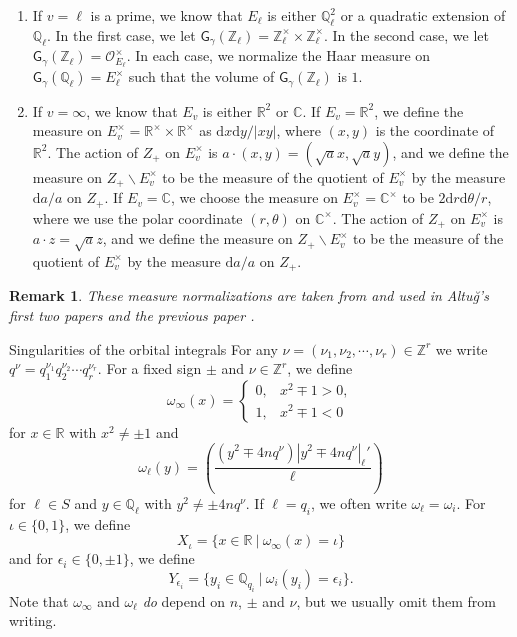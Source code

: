 \documentclass[10pt,oneside,reqno]{amsart}
\makeatletter
\newcommand\rmd{\mathrm{d}}
\newcommand\cO{\mathcal{O}}
\newcommand\CC{\mathbb{C}}
\newcommand\QQ{\mathbb{Q}}
\newcommand\RR{\mathbb{R}}
\newcommand\ZZ{\mathbb{Z}}
\newcommand\G{\mathsf{G}}
\newcommand\bs{\backslash}
\newcommand\legendresymbol[2]{\genfrac{(}{)}{}{}{#1}{#2}}
\def\subsection{\@startsection{subsection}{2}
  \z@{3pt\@plus0pt}{-.5em}%
  {\normalfont\bfseries}}
\theoremstyle{THEOREM}
\theoremstyle{DEFINITION}
\theoremstyle{EXERCISE}
\newtheorem{remark}[theorem]{Remark}
\numberwithin{equation}{section}
\makeatother
\begin{document}
\begin{enumerate}[itemsep=0pt,parsep=0pt,topsep=0pt,leftmargin=0pt,labelsep=3pt,itemindent=9pt,label=\textbullet]
  \item If $v=\ell$ is a prime, we know that $E_\ell$ is either $\QQ_\ell^2$ or a quadratic extension of $\QQ_\ell$. In the first case, we let $\G_\gamma(\ZZ_\ell)=\ZZ_\ell^\times \times \ZZ_\ell^\times$. In the second case, we let $\G_\gamma(\ZZ_\ell)=\cO_{E_\ell}^\times$.
  In each case, we normalize the Haar measure on $\G_\gamma(\QQ_\ell)=E_\ell^\times$ such that the volume of $\G_\gamma(\ZZ_\ell)$ is $1$.
  \item If $v=\infty$, we know that $E_v$ is either $\RR^2$ or $\CC$. If $E_v=\RR^2$, we define the measure on $E_v^\times=\RR^\times \times \RR^\times$ as $\rmd x\rmd y/|xy|$, where $(x,y)$ is the coordinate of $\RR^2$. The action of $Z_+$ on $E_v^\times$ is $a\cdot(x,y)=(\sqrt{a}x,\sqrt{a}y)$, and we define the measure on $Z_+\bs E_v^\times$ to be the measure of the quotient of $E_v^\times$ by the measure $\rmd a/a$ on $Z_+$. If $E_v=\CC$, we choose the  measure on $E_v^\times=\CC^\times$ to be $2\rmd r\rmd \theta/r$, where we use the polar coordinate $(r,\theta)$ on $\CC^\times$. The action of $Z_+$ on $E_v^\times$ is $a\cdot z=\sqrt{a}z$, and we define the measure on $Z_+\bs E_v^\times$ to be the measure of the quotient of $E_v^\times$ by the measure $\rmd a/a$ on $Z_+$.
\end{enumerate} 

\begin{remark}
These measure normalizations are taken from \cite{langlands2004} and used in Altu\u{g}'s first two papers \cite{altug2015,altug2017} and the previous paper \cite{cheng2025}.
\end{remark}

\subsection{Singularities of the orbital integrals}\label{subsec:singularities}
For any $\nu=(\nu_1,\nu_2,\cdots,\nu_r)\in \ZZ^r$ we write $q^\nu=q_1^{\nu_1}q_2^{\nu_2}\cdots q_r^{\nu_r}$.  For a fixed sign $\pm$ and $\nu\in \ZZ^r$, we define
\[
\omega_\infty(x)=\begin{cases}
             0, & x^2\mp 1>0, \\
             1, & x^2\mp 1<0
           \end{cases}
\]
for $x\in \RR$ with $x^2\neq \pm 1$ and
\[
\omega_\ell(y)=\legendresymbol{(y^2\mp 4nq^\nu)|y^2\mp 4nq^\nu|_{\ell}'}{\ell}
\]
for $\ell\in S$ and $y\in \QQ_\ell$ with $y^2\neq \pm 4nq^\nu$. If $\ell=q_i$, we often write $\omega_\ell=\omega_i$. For $\iota\in \{0,1\}$, we define
\[
X_{\iota}=\{x\in \RR\ |\ \omega_\infty(x)=\iota\}
\]
and for $\epsilon_i\in \{0,\pm 1\}$, we define
\[
Y_{\epsilon_i}=\{y_i\in \QQ_{q_i}\ |\ \omega_i(y_i)=\epsilon_i\}. 
\]
Note that $\omega_\infty$ and $\omega_\ell$ \emph{do} depend on $n$, $\pm$ and $\nu$, but we usually omit them from writing.
\end{document}

